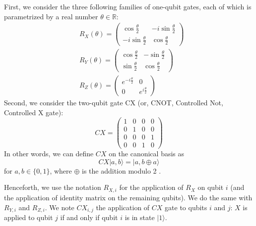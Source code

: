 \begin{example}
First, we consider the three following families of one-qubit gates, each of which is parametrized by a real number $\theta \in \mathbb{R}$:
\begin{align}
& R_{X}(\theta)=\left(\begin{array}{cc}
\cos \frac{\theta}{2} & -i \sin \frac{\theta}{2} \\
-i \sin \frac{\theta}{2} & \cos \frac{\theta}{2}
\end{array}\right)  \tag{5}\\
& R_{Y}(\theta)=\left(\begin{array}{cc}
\cos \frac{\theta}{2} & -\sin \frac{\theta}{2} \\
\sin \frac{\theta}{2} & \cos \frac{\theta}{2}
\end{array}\right)  \tag{6}\\
& R_{Z}(\theta)=\left(\begin{array}{cc}
e^{-i \frac{\theta}{2}} & 0 \\
0 & e^{i \frac{\theta}{2}}
\end{array}\right) \tag{7}
\end{align}
Second, we consider the two-qubit gate CX (or, CNOT, Controlled Not, Controlled X gate):
\begin{equation}
    C X=\left(\begin{array}{llll}
1 & 0 & 0 & 0  \tag{8}\\
0 & 1 & 0 & 0 \\
0 & 0 & 0 & 1 \\
0 & 0 & 1 & 0
\end{array}\right)
\end{equation}
In other words, we can define $C X$ on the canonical basis as
\begin{equation}
    C X|a, b\rangle=|a, b \oplus a\rangle
\end{equation}
for $a, b \in\{0,1\}$, where $\oplus$ is the addition modulo 2 .
\end{example}

\begin{remark}
Henceforth, we use the notation $R_{X, i}$ for the application of $R_{X}$ on qubit $i$ (and the application of identity matrix on the remaining qubits). We do the same with $R_{Y, i}$ and $R_{Z, i}$. 
We note $C X_{i, j}$ the application of $C X$ gate to qubits $i$ and $j$: $X$ is applied to qubit $j$ if and only if qubit $i$ is in state $|1\rangle$.
\end{remark}


